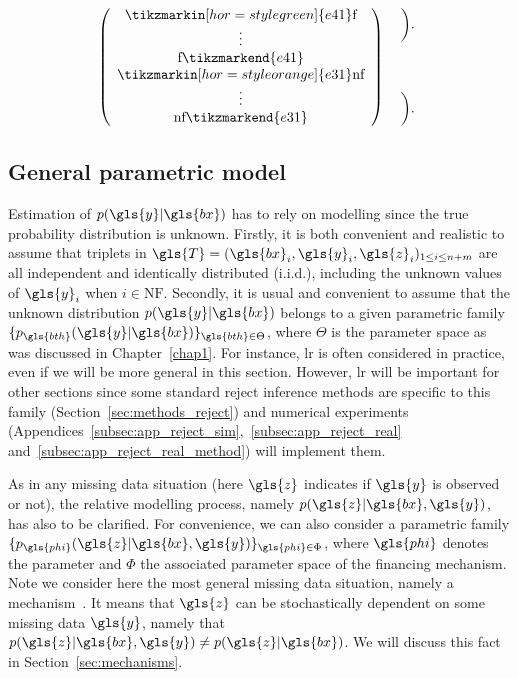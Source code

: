 \[\left( \begin{array}{c}
\tikzmarkin[hor=style green]{e41} \text{f} \\
\vdots \\
\text{f} \tikzmarkend{e41} \\ 
\tikzmarkin[hor=style orange]{e31} \text{nf} \\
\vdots \\
\text{nf} \tikzmarkend{e31} \end{array} \right)
 \hspace{0.2cm}
 \begin{array}{c}
\bigg). \\
\\
\\
\\
\bigg). \end{array}
\]


\subsection{General parametric model}

Estimation of $p(\gls{y}|\gls{bx})$ has to rely on modelling since the true probability distribution is unknown. Firstly, it is both convenient and realistic to assume that triplets in $\gls{T} = (\gls{bx}_i,\gls{y}_i,\gls{z}_i)_{1\le i\le n+m}$ are all independent and identically distributed (i.i.d.), including the unknown values of $\gls{y}_i$ when $i\in \text{NF}$. Secondly, it is usual and convenient to assume that the unknown distribution $p(\gls{y}|\gls{bx})$ belongs to a given parametric family $\{p_{\gls{bth}}(\gls{y}|\gls{bx})\}_{\gls{bth} \in\Theta}$, where $\Theta$ is the parameter space as was discussed in Chapter~\ref{chap1}. For instance, \gls{lr} is often considered in practice, even if we will be more general in this section. However, \gls{lr} will be important for other sections since some standard reject inference methods are specific to this family (Section~\ref{sec:methods_reject}) and numerical experiments (Appendices~\ref{subsec:app_reject_sim},~\ref{subsec:app_reject_real} and~\ref{subsec:app_reject_real_method}) will implement them.

As in any missing data situation (here $\gls{z}$ indicates if $\gls{y}$ is observed or not), the relative modelling process, namely $p(\gls{z}|\gls{bx},\gls{y})$, has also to be clarified. For convenience, we can also consider a parametric family $\{p_{\gls{phi}}(\gls{z}|\gls{bx},\gls{y})\}_{\gls{phi} \in \Phi}$, where $\gls{phi}$ denotes the parameter and $\Phi$ the associated parameter space of the financing mechanism. Note we consider here the most general missing data situation, namely a  mechanism~\cite{littlerubin}. It means that $\gls{z}$ can be stochastically dependent on some missing data $\gls{y}$, namely that $p(\gls{z}|\gls{bx},\gls{y})\neq p(\gls{z}|\gls{bx})$. We will discuss this fact in Section~\ref{sec:mechanisms}.

